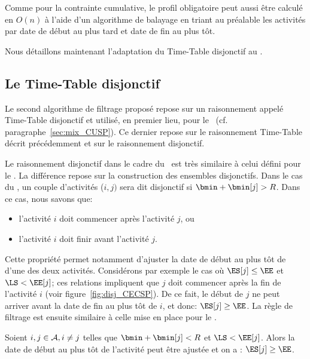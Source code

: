 Comme pour la contrainte cumulative, le profil obligatoire peut aussi
être calculé en $O(n)$ à l'aide d'un algorithme de balayage en triant
au préalable les activités par date de début au plus tard et date de
fin au plus tôt.

Nous détaillons maintenant l'adaptation du Time-Table disjonctif au
\CECSP. 

\subsection{Le Time-Table disjonctif}
\label{sec:TTDR_CECSP}

Le second algorithme de filtrage proposé repose sur un raisonnement
appelé Time-Table disjonctif et utilisé, en premier lieu, pour le
\CUSP~(cf. paragraphe~\ref{sec:mix_CUSP}). Ce dernier repose sur le
raisonnement Time-Table décrit précédemment et sur le raisonnement
disjonctif.

Le raisonnement disjonctif dans le cadre du \CECSP~est très similaire
à celui défini pour le \CUSP. La différence repose sur la construction
des ensembles disjonctifs. Dans le cas du \CECSP, un couple
d'activités ($i,j)$ sera dit disjonctif si $\bmin+\bmin[j] >R$. Dans
ce cas, nous savons que:
\begin{itemize}
\item l'activité $i$ doit commencer après l'activité $j$, ou 
\item l'activité $i$ doit finir avant l'activité $j$.  
\end{itemize}

Cette propriété permet notamment d'ajuster la date de début au
plus tôt de d'une des deux activités. Considérons par exemple le cas
où $\ES[j] \le \EE$ et $\LS < \EE[j]$; ces relations 
impliquent que $j$ doit commencer après la fin de l'activité $i$ (voir
figure~\ref{fig:disj_CECSP}). De ce fait, le début de $j$ ne peut
arriver avant la date de fin au plus tôt de $i$, et donc: $\ES[j] \ge
\EE$. La règle de filtrage est ensuite similaire à celle mise en place
pour le \CUSP.

\begin{reg}
Soient $i, j \in {\cal A}, i \neq j$ telles que $\bmin+\bmin[j] < R$ et $\LS
< \EE[j]$. Alors la date de début au plus tôt de l’activité peut être
ajustée et on a : $\ES[j] \ge \EE$.
\end{reg}

